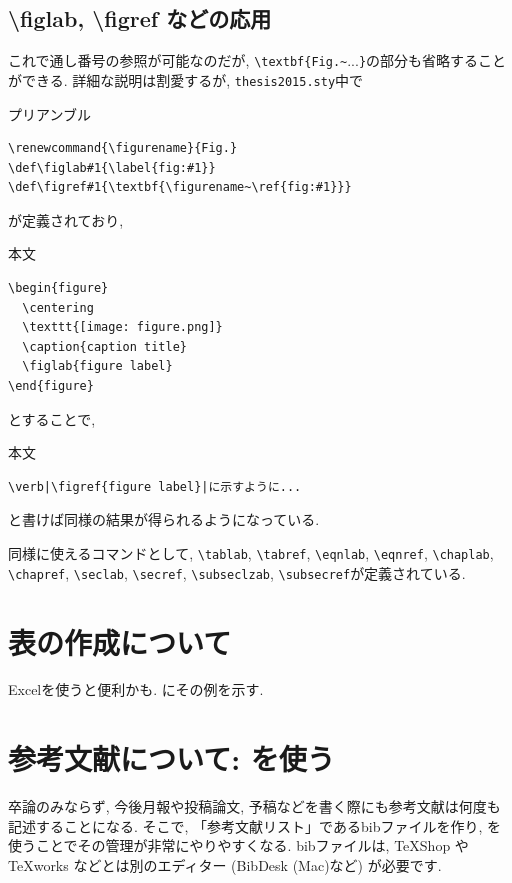\subsection{\textbackslash figlab, \textbackslash figref などの応用}
これで通し番号の参照が可能なのだが, \verb|\textbf{Fig.~|...\verb|}|の部分も省略することができる. 詳細な説明は割愛するが, \verb|thesis2015.sty|中で
\begin{itembox}[c]{プリアンブル}
\begin{verbatim} 
\renewcommand{\figurename}{Fig.}
\def\figlab#1{\label{fig:#1}}
\def\figref#1{\textbf{\figurename~\ref{fig:#1}}}
\end{verbatim}
\end{itembox}
が定義されており, 
\begin{itembox}[c]{本文}
\begin{verbatim} 
\begin{figure}
  \centering
  \texttt{[image: figure.png]}
  \caption{caption title}
  \figlab{figure label}
\end{figure}
\end{verbatim}
\end{itembox}
とすることで, 
\begin{itembox}[c]{本文}
\begin{verbatim} 
\verb|\figref{figure label}|に示すように...
\end{verbatim}
\end{itembox}
と書けば同様の結果が得られるようになっている. 

同様に使えるコマンドとして, \verb|\tablab|, \verb|\tabref|, \verb|\eqnlab|, \verb|\eqnref|, \verb|\chaplab|, \verb|\chapref|, \verb|\seclab|, \verb|\secref|, \verb|\subseclzab|, \verb|\subsecref|が定義されている. 

\section{表の作成について}
Excelを使うと便利かも. にその例を示す. 






\section{参考文献について: \BibTeX を使う}
卒論のみならず, 今後月報や投稿論文, 予稿などを書く際にも参考文献は何度も記述することになる. そこで, 「参考文献リスト」であるbibファイルを作り, \BibTeX を使うことでその管理が非常にやりやすくなる. bibファイルは, TeXShop やTeXworks などとは別のエディター (BibDesk (Mac)など) が必要です. 


